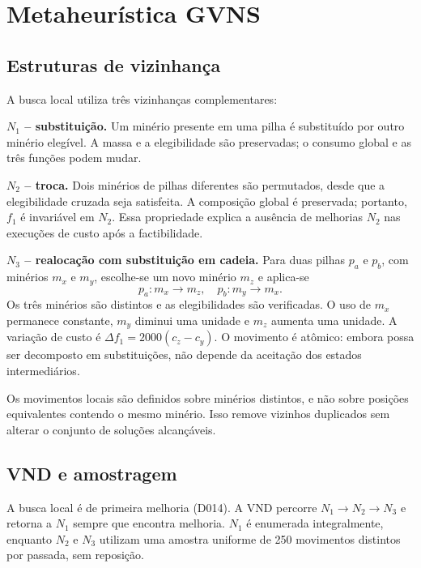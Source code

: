 \documentclass[10pt,twocolumn,a4paper]{article}
\begin{document}
\section{Metaheurística GVNS}
\label{sec:gvns}

\subsection{Estruturas de vizinhança}

A busca local utiliza três vizinhanças complementares:

\noindent\textbf{$N_1$ -- substituição.} Um minério presente em uma pilha é substituído por outro minério elegível. A massa e a elegibilidade são preservadas; o consumo global e as três funções podem mudar.

\noindent\textbf{$N_2$ -- troca.} Dois minérios de pilhas diferentes são permutados, desde que a elegibilidade cruzada seja satisfeita. A composição global é preservada; portanto, $f_1$ é invariável em $N_2$. Essa propriedade explica a ausência de melhorias $N_2$ nas execuções de custo após a factibilidade.

\noindent\textbf{$N_3$ -- realocação com substituição em cadeia.} Para duas pilhas $p_a$ e $p_b$, com minérios $m_x$ e $m_y$, escolhe-se um novo minério $m_z$ e aplica-se
\begin{equation}
p_a : m_x \to m_z, \quad p_b : m_y \to m_x.
\end{equation}
Os três minérios são distintos e as elegibilidades são verificadas. O uso de $m_x$ permanece constante, $m_y$ diminui uma unidade e $m_z$ aumenta uma unidade. A variação de custo é $\Delta f_1 = 2000(c_z - c_y)$. O movimento é atômico: embora possa ser decomposto em substituições, não depende da aceitação dos estados intermediários.

Os movimentos locais são definidos sobre minérios distintos, e não sobre posições equivalentes contendo o mesmo minério. Isso remove vizinhos duplicados sem alterar o conjunto de soluções alcançáveis.

\subsection{VND e amostragem}

A busca local é de primeira melhoria (D014). A VND percorre $N_1 \to N_2 \to N_3$ e retorna a $N_1$ sempre que encontra melhoria. $N_1$ é enumerada integralmente, enquanto $N_2$ e $N_3$ utilizam uma amostra uniforme de 250 movimentos distintos por passada, sem reposição.
\end{document}
